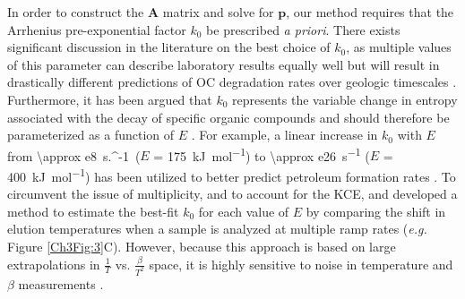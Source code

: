 In order to construct the $\mathbf{A}$ matrix and solve for $\mathbf{p}$, our method requires that the Arrhenius pre-exponential factor $k_{0}$ be prescribed \textit{a priori}. There exists significant discussion in the literature on the best choice of $k_{0}$, as multiple values of this parameter can describe laboratory results equally well but will result in drastically different predictions of OC degradation rates over geologic timescales \citep{Braun:1987vf,Burnham:1987ut,Lakshmanan:1991tr,Dieckmann:2005dw}. Furthermore, it has been argued that $k_{0}$ represents the variable change in entropy associated with the decay of specific organic compounds and should therefore be parameterized as a function of $E$ \citep[the so-called "kinetic compensation effect" or "KCE";][]{Tang:2000ua}. For example, a linear increase in $k_{0}$ with $E$ from \SI{\approx e8}{s.^{-1}} ($E$ = \SI{175}{kJ.mol^{-1}}) to \SI{\approx e26}{s^{-1}} ($E$ = \SI{400}{kJ.mol^{-1}}) has been utilized to better predict petroleum formation rates \citep{Dieckmann:2005dw}. To circumvent the issue of multiplicity, and to account for the KCE, \citet{Miura:1995uo} and \citet{Miura:1998jf} developed a method to estimate the best-fit $k_{0}$ for each value of $E$ by comparing the shift in elution temperatures when a sample is analyzed at multiple ramp rates (\textit{e.g.} Figure \ref{Ch3Fig:3}C). However, because this approach is based on large extrapolations in $\frac{1}{T}$ vs. $\frac{\beta}{T^{2}}$ space, it is highly sensitive to noise in temperature and $\beta$ measurements \citep{Burnham:1989vm}.

